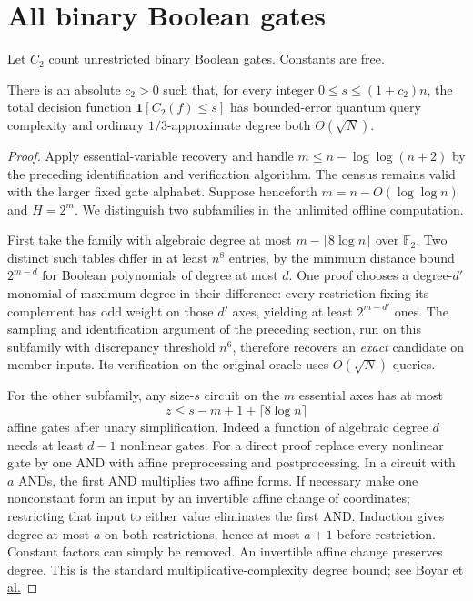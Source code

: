 \section{All binary Boolean gates}
Let $C_2$ count unrestricted binary Boolean gates. Constants are free.
\begin{theorem}\label{th:fullbasis}
There is an absolute $c_2>0$ such that, for every integer
$0\le s\le (1+c_2)n$, the total decision function
$\mathbf1[C_2(f)\le s]$ has bounded-error quantum query complexity
and ordinary $1/3$-approximate degree both $\Theta(\sqrt N)$.
\end{theorem}
\begin{proof}
Apply essential-variable recovery and handle $m\le n-\log\log(n+2)$ by the preceding identification and verification algorithm. The census remains valid with the larger fixed gate alphabet. Suppose henceforth $m=n-O(\log\log n)$ and $H=2^m$. We distinguish two subfamilies in the unlimited offline computation.

First take the family with algebraic degree at most $m-\lceil8\log n\rceil$ over $\mathbb F_2$. Two distinct such tables differ in at least $n^8$ entries, by the minimum distance bound $2^{m-d}$ for Boolean polynomials of degree at most $d$. One proof chooses a degree-$d'$ monomial of maximum degree in their difference: every restriction fixing its complement has odd weight on those $d'$ axes, yielding at least $2^{m-d'}$ ones. The sampling and identification argument of the preceding section, run on this subfamily with discrepancy threshold $n^6$, therefore recovers an \emph{exact} candidate on member inputs. Its verification on the original oracle uses $O(\sqrt N)$ queries.

For the other subfamily, any size-$s$ circuit on the $m$ essential axes has at most
\[
                        z\le s-m+1+\lceil8\log n\rceil
\]
affine gates after unary simplification. Indeed a function of algebraic degree $d$ needs at least $d-1$ nonlinear gates. For a direct proof replace every nonlinear gate by one AND with affine preprocessing and postprocessing. In a circuit with $a$ ANDs, the first AND multiplies two affine forms. If necessary make one nonconstant form an input by an invertible affine change of coordinates; restricting that input to either value eliminates the first AND. Induction gives degree at most $a$ on both restrictions, hence at most $a+1$ before restriction. Constant factors can simply be removed. An invertible affine change preserves degree. This is the standard multiplicative-complexity degree bound; see \href{https://pmc.ncbi.nlm.nih.gov/articles/PMC7047778/}{Boyar et al.}


\end{proof}
